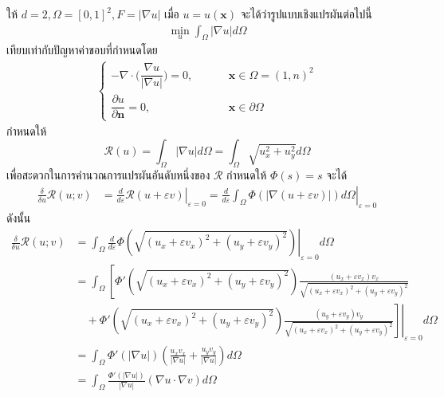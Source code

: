 \begin{Example}
    ให้ $d = 2, \Omega = [0,1]^2, F = |\nabla u| \text{ เมื่อ } u = u(\mathbf{x})$ จะได้ว่ารูปแบบเชิงแปรผันต่อไปนี้ 
    \begin{align*}
        \underset{u}{\min} \int_{\Omega} |\nabla u| d \Omega 
    \end{align*}
    เทียบเท่ากับปัญหาค่าขอบที่กำหนดโดย
    \begin{align}
        \left \{ \begin{array}{ll}  - \nabla \cdot  \Big( \dfrac{\nabla u}{|\nabla u|} \Big) = 0,  & \hspace{1cm} \mathbf{x} \in \Omega = (1,n)^2 \\ \dfrac{\partial u}{\partial \boldsymbol{n}} = 0, & \hspace{1cm} \mathbf{x} \in \partial \Omega \end{array} \right .
    \end{align}
    \hspace{1cm} กำหนดให้ \[
        \mathcal{R}(u) = \int_\Omega |\nabla u| d \Omega = \int_\Omega \sqrt{u_x^2+u_y^2} d \Omega
    \]
    เพื่อสะดวกในการคำนวณการแปรผันอันดับหนึ่งของ  $\mathcal{R}$ กำหนดให้ $\Phi (s)=s$ จะได้
    \begin{align*}
    \frac{\delta}{\delta u}\mathcal{R}(u;v) &= \left.\frac{d}{d\varepsilon}\mathcal{R}(u+\varepsilon v) \right|_{\varepsilon = 0} 
    = \left.\frac{d}{d\varepsilon} \int_{\Omega} \Phi (|\nabla (u + \varepsilon v)|)d\Omega 
    \right|_{\varepsilon = 0} 
    \end{align*}
    ดังนั้น
    \begin{align*}
    \frac{\delta}{\delta u}\mathcal{R}(u;v) 
    &= \int_{\Omega} \left.\frac{d}{d\varepsilon} \Phi ({\sqrt{(u_x+\varepsilon v_x)^2 + (u_y+\varepsilon v_y)^2 }})\right|_{\varepsilon = 0} d\Omega \\
    &= \int_{\Omega}^{}\left[\Phi'({\sqrt{(u_x+\varepsilon v_x)^2 + (u_y+\varepsilon v_y)^2 }}) \frac{(u_x+\varepsilon v_x)v_x}{{\sqrt{(u_x+\varepsilon v_x)^2+ (u_y+\varepsilon v_y)^2 }}}\right.\\
    &\quad + \Phi'({\sqrt{(u_x+\varepsilon v_x)^2 + (u_y+\varepsilon v_y)^2 }}) \left.\left.\frac{(u_y+\varepsilon v_y)v_y}{{\sqrt{(u_x+\varepsilon v_x)^2 + (u_y+\varepsilon v_y)^2 }}}\right] \right|_{\varepsilon = 0} d\Omega 
    \\
    &= \int_{\Omega} \Phi'(|\nabla u|)\left(\frac{u_x v_x}{|\nabla u|} + \frac{u_y v_y}{|\nabla u|} \right) d\Omega \\
    &= \int_{\Omega} \frac{\Phi'(|\nabla u|)}{|\nabla u|} (\nabla u \cdot \nabla v)d\Omega \\

\end{align*}
\end{Example}
